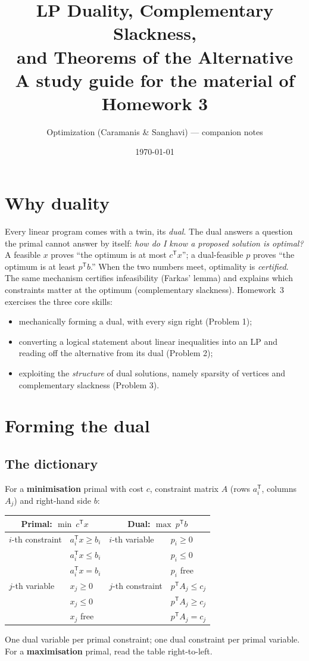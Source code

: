 \documentclass[11pt]{article}
\title{LP Duality, Complementary Slackness,\\ and Theorems of the Alternative\\ \large A study guide for the material of Homework 3}
\author{Optimization (Caramanis \& Sanghavi) --- companion notes}
\date{\today}
\newcommand{\T}{^{\mathsf T}}
\theoremstyle{definition}
\theoremstyle{plain}
\theoremstyle{remark}
\begin{document}
\maketitle
\tableofcontents
\bigskip

\section{Why duality}
Every linear program comes with a twin, its \emph{dual}. The dual answers a question the primal cannot answer by itself: \emph{how do I know a proposed solution is optimal?} A feasible $x$ proves ``the optimum is at most $c\T x$''; a dual-feasible $p$ proves ``the optimum is at least $p\T b$.'' When the two numbers meet, optimality is \emph{certified}. The same mechanism certifies infeasibility (Farkas' lemma) and explains which constraints matter at the optimum (complementary slackness). Homework~3 exercises the three core skills:
\begin{itemize}
\item mechanically forming a dual, with every sign right (Problem 1);
\item converting a logical statement about linear inequalities into an LP and reading off the alternative from its dual (Problem 2);
\item exploiting the \emph{structure} of dual solutions, namely sparsity of vertices and complementary slackness (Problem 3).
\end{itemize}

\section{Forming the dual}
\subsection{The dictionary}
For a \textbf{minimisation} primal with cost $c$, constraint matrix $A$ (rows $a_i\T$, columns $A_j$) and right-hand side $b$:
\begin{center}\renewcommand{\arraystretch}{1.2}
\begin{tabular}{@{}l@{\qquad}l@{\qquad\qquad}l@{\qquad}l@{}}\toprule
\multicolumn{2}{c}{\textbf{Primal:} $\min\ c\T x$} & \multicolumn{2}{c}{\textbf{Dual:} $\max\ p\T b$}\\ \midrule
$i$-th constraint & $a_i\T x\ge b_i$ & $i$-th variable & $p_i\ge0$\\
 & $a_i\T x\le b_i$ & & $p_i\le0$\\
 & $a_i\T x= b_i$ & & $p_i$ free\\[3pt]
$j$-th variable & $x_j\ge0$ & $j$-th constraint & $p\T A_j\le c_j$\\
 & $x_j\le0$ & & $p\T A_j\ge c_j$\\
 & $x_j$ free & & $p\T A_j= c_j$\\ \bottomrule
\end{tabular}\end{center}
One dual variable per primal constraint; one dual constraint per primal variable. For a \textbf{maximisation} primal, read the table right-to-left.
\end{document}
